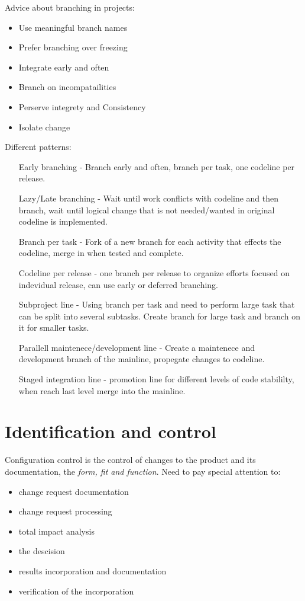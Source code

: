 \documentclass{article}
\begin{document}
\begin{itemize}
\begin{itemize}
\begin{itemize}
    Advice about branching in projects:
    \begin{itemize}
    \item Use meaningful branch names
    \item Prefer branching over freezing
    \item Integrate early and often
    \item Branch on incompatailities
    \item Perserve integrety and Consistency
    \item Isolate change
    \end{itemize}

    Different patterns:
    \begin{itemize}
    \item[Early branching] - Branch early and often, branch per task, one codeline per release.
    \item[Lazy/Late branching] - Wait until work conflicts with codeline and then branch, wait until logical change that is not needed/wanted in original codeline is implemented.
    \item[Branch per task] - Fork of a new branch for each activity that effects the codeline, merge in when tested and complete.
    \item[Codeline per release] - one branch per release to organize efforts focused on indevidual release, can use early or deferred branching.
    \item[Subproject line] - Using branch per task and need to perform large task that can be split into several subtasks. Create branch for large task and branch on it for smaller tasks.
    \item[Parallell maintenece/development line] - Create a maintenece and development branch of the mainline, propegate changes to codeline.
    \item[Staged integration line ]- promotion line for different levels of code stabililty, when reach last level merge into the mainline.
    \end{itemize}

    \section{Identification and control}
    Configuration control is the control of changes to the product and its documentation, the \textit{form, fit and function}. 
    Need to pay special attention to:
    \begin{itemize}
    \item change request documentation
    \item change request processing
    \item total impact analysis
    \item the descision
    \item results incorporation and documentation
    \item verification of the incorporation
    \end{itemize}


\end{itemize}
\end{itemize}
\end{itemize}
\end{document}
